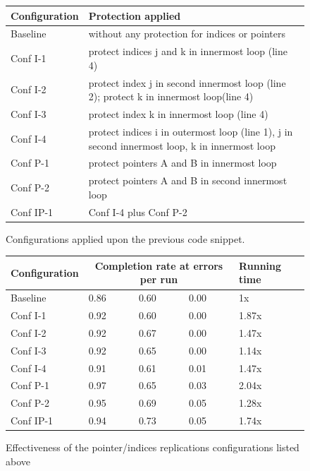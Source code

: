 \documentclass{article}
\begin{document}
\begin{figure}[h!]
\begin{center}
\begin{tabular}{|p{2.3cm}|p{8cm}|}
\hline
Configuration & Protection applied \\
\hline
Baseline & without any protection for indices or pointers \\
Conf I-1 & protect indices j and k in innermost loop (line 4)\\
Conf I-2 & protect index j in second innermost loop (line 2); protect k in innermost loop(line 4) \\
Conf I-3 & protect index k in innermost loop (line 4)\\
Conf I-4 & protect indices i in outermost loop (line 1), j in second innermost loop, k in innermost loop \\
Conf P-1 & protect pointers A and B in innermost loop \\
Conf P-2 & protect pointers A and B in second innermost loop \\
Conf IP-1 & Conf I-4 plus Conf P-2 \\
\hline
\end{tabular}
\end{center}
\caption{Configurations applied upon the previous code snippet.}
\label{fig:confsAndProtections}
\end{figure}

\begin{figure}[h!]
\begin{center}
\begin{tabular}{|p{2.3cm}p{1cm}p{1cm}p{1cm}p{2.2cm}|}
\hline
Configuration & \multicolumn{3}{c}{Completion rate at errors per run} & Running time\\
\hline
Baseline & 0.86 & 0.60 & 0.00 & 1x \\
Conf I-1 & 0.92 & 0.60 & 0.00 & 1.87x \\
Conf I-2 & 0.92 & 0.67 & 0.00 & 1.47x \\
Conf I-3 & 0.92 & 0.65 & 0.00 & 1.14x \\
Conf I-4 & 0.91 & 0.61 & 0.01 & 1.47x \\
Conf P-1 & 0.97 & 0.65 & 0.03 & 2.04x \\
Conf P-2 & 0.95 & 0.69 & 0.05 & 1.28x \\
Conf IP-1 & 0.94 & 0.73 & 0.05 & 1.74x \\
\hline
\end{tabular}
\end{center}
\caption{Effectiveness of the pointer/indices replications configurations listed above}
\label{fig:effectivenesses}
\end{figure}
\end{document}

